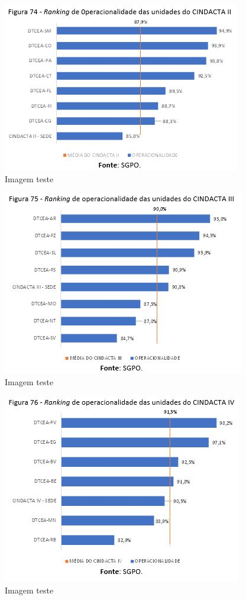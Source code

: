 \documentclass[
]{book}
\begin{document}
\begin{figure}
\centering
\includegraphics{imagens/fig60.jpg}
\caption{Imagem teste}
\end{figure}

\begin{figure}
\centering
\includegraphics{imagens/fig61.jpg}
\caption{Imagem teste}
\end{figure}

\begin{figure}
\centering
\includegraphics{imagens/fig62.jpg}
\caption{Imagem teste}
\end{figure}
\end{document}
